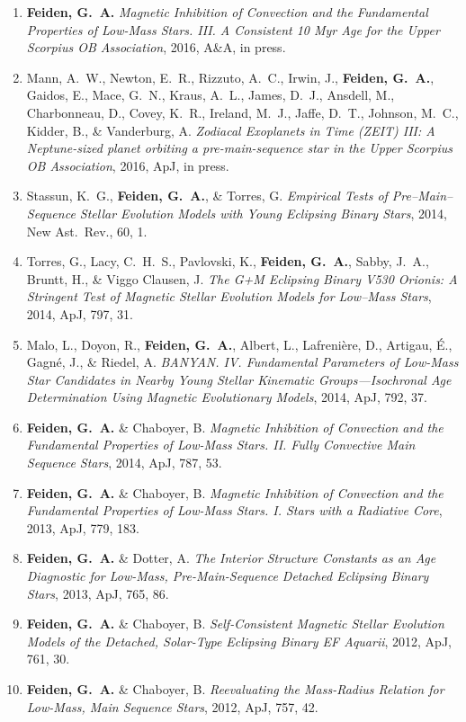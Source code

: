 \begin{enumerate}
	\setlength{\itemsep}{0em}
	\item {\bf Feiden, G.~A.} {\it Magnetic Inhibition of Convection and the Fundamental Properties of Low-Mass Stars. III. A Consistent 10 Myr Age for the Upper Scorpius OB Association}, 2016, A\&A, in press.
	
	\item Mann, A.~W., Newton, E.~R., Rizzuto, A.~C., {Irwin}, J., 
	{\bf {Feiden}, G.~A.}, {Gaidos}, E., {Mace}, G.~N., {Kraus}, A.~L., 
	{James}, D.~J., {Ansdell}, M., {Charbonneau}, D., {Covey}, K.~R., 
	{Ireland}, M.~J., {Jaffe}, D.~T., {Johnson}, M.~C., 
	{Kidder}, B., \& {Vanderburg}, A. \emph{Zodiacal Exoplanets in Time (ZEIT) III: A Neptune-sized planet orbiting a pre-main-sequence star in the Upper Scorpius OB Association}, 2016, ApJ, in press. 
	
	\item Stassun, K.~G., {\bf Feiden, G.~A.}, \& Torres, G. {\it Empirical Tests of Pre--Main--Sequence Stellar Evolution Models with Young Eclipsing Binary Stars}, 2014, New Ast.\ Rev., 60, 1.
	
	\item Torres, G., Lacy, C.~H.~S., Pavlovski, K., {\bf Feiden, G.~A.}, {Sabby}, J.~A., {Bruntt}, H., \& {Viggo Clausen}, J. {\it The G+M Eclipsing Binary V530 Orionis: A Stringent Test of Magnetic Stellar Evolution Models for Low--Mass Stars}, 2014, ApJ, 797, 31.
	
	\item Malo, L., Doyon, R., {\bf Feiden, G.~A.}, {Albert}, L., 
	{Lafreni{\`e}re}, D., {Artigau}, {\'E}., {Gagn{\'e}}, J., \& 
	{Riedel}, A. {\it BANYAN. IV. Fundamental Parameters of Low-Mass Star Candidates in Nearby Young Stellar Kinematic Groups---Isochronal Age Determination Using Magnetic Evolutionary Models}, 2014, ApJ, 792, 37.
	
	\item  {\bf Feiden, G.~A.} \& Chaboyer, B. {\it Magnetic Inhibition of Convection and the Fundamental Properties of Low-Mass Stars. II. Fully Convective Main Sequence Stars}, 2014, ApJ, 787, 53.
	
	\item  {\bf Feiden, G.~A.} \& Chaboyer, B. {\it Magnetic Inhibition of Convection and the Fundamental Properties of Low-Mass Stars. I. Stars with a Radiative Core}, 2013, ApJ, 779, 183.
	
	\item {\bf Feiden, G.~A.} \& Dotter, A. {\it The Interior Structure Constants as an Age Diagnostic for Low-Mass, Pre-Main-Sequence Detached Eclipsing Binary Stars}, 2013, ApJ, 765, 86.
	
	\item {\bf Feiden, G.~A.} \& Chaboyer, B. {\it Self-Consistent Magnetic Stellar Evolution Models of the Detached, Solar-Type Eclipsing Binary EF Aquarii}, 2012, ApJ, 761, 30.
	
	\item \textbf{Feiden, G.~A.} \& Chaboyer, B. \emph{Reevaluating the Mass-Radius Relation for Low-Mass, Main Sequence Stars}, 2012, ApJ, 757, 42. 

\end{enumerate}
